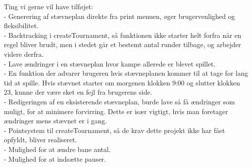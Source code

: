Ting vi gerne vil have tilføjet:\\
- Generering af stævneplan direkte fra print menuen, øger brugervenlighed og fleksibilitet.\\
- Backtracking i createTournament, så funktionen ikke starter helt forfra når en regel bliver brudt, men i stedet går et bestemt antal runder tilbage, og arbejder videre derfra.\\
- Lave ændringer i en stævneplan hvor kampe allerede er blevet spillet.\\ 
- En funktion der advarer brugeren hvis stævneplanen kommer til at tage for lang tid at spille. Hvis stævnet starter om morgenen klokken 9:00 og slutter klokken 23, kunne der være sket en fejl fra brugerens side.\\
- Redigeringen af en eksisterende stævneplan, burde lave så få ændringer som muligt, for at minimere forvirring. Dette er især vigtigt, hvis man foretager ændringer mens stævnet er i gang.\\
- Pointsystem til createTournament, så de krav dette projekt ikke har fået opfyldt, bliver realiseret. \\
- Mulighed for at ændre bane antal.\\
- Mulighed for at indsætte pauser.\\
